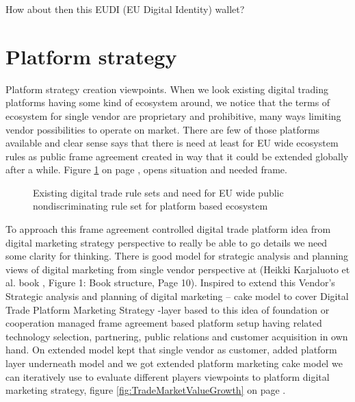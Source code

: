 How about then this EUDI (EU Digital Identity) wallet? 

\section{Platform strategy}
\label{platform_strategy}

Platform strategy creation viewpoints.
When we look ex\-ist\-ing digital trading platforms having some kind of ecosystem around, we notice that the terms of ecosystem for single vendor are proprietary and prohibitive, many ways limiting vendor possibilities to operate on market. There are few of those platforms available and clear sense says that there is need at least for EU wide ecosystem rules as public frame agreement created in way that it could be extended globally after a while. Figure \ref{fig:TermSets} on page \pageref{fig:TermSets}, opens situation and needed frame.

\begin{figure} %
 \begin{center}
  \caption{Existing digital trade rule sets and need for EU wide public nondiscriminating rule set for platform based ecosystem}
  \label{fig:TermSets}
 \end{center}
\end{figure}

To approach this frame agreement controlled digital trade platform idea from digital marketing strategy perspective to really be able to go details we need some clarity for thinking. There is good model for strategic analysis and planning views of digital marketing from single vendor perspective at (Heikki Karjaluoto et al. book \cite{Karjaluoto2022}, Figure 1: Book structure, Page 10). Inspired to extend this Vendor's Strategic analysis and planning of digital marketing -- cake model to cover Digital Trade Platform Marketing Strategy -layer based to this idea of foundation or cooperation managed frame agreement based platform setup having related technology selection, partnering, public relations and customer acquisition in own hand. On extended model kept that single vendor as customer, added platform layer underneath model and we got extended platform marketing cake model we can iteratively use to evaluate different players viewpoints to platform digital marketing strategy, figure \ref{fig:TradeMarketValueGrowth} on page \pageref{fig:TradeMarketValueGrowth}.

